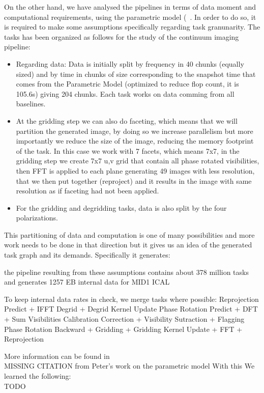 On the other hand, we have analysed the pipelines in terms of data moment and computational requirements, using 
the parametric model (~\cite{ParametricModel}. In order to do so, it is required to make some assumptions specifically regarding
task granunarity. The tasks has been organized as follows for the study of the continuum imaging pipeline:
\begin{itemize}
\item Regarding data: Data is initially split by frequency in 40 chunks (equally sized) and by time in chunks of size corresponding to the snapshot time
that comes from the Parametric Model (optimized to reduce flop count, it is 105.6s) giving 204 chunks. Each task works on data comming from all baselines.
\item At the gridding step we can also do faceting, which means that we will partition the generated image, by doing so we increase parallelism but more
importantly we reduce the size of the image, reducing the memory footprint of the task. 
In this case we work with 7 facets, which means 7x7, in the gridding step we create 7x7 u,v grid that contain
all phase rotated visibilities, then FFT is applied to each plane generating 49 images with less resolution, that we then put together (reproject) and it
results in the image with same resolution as if faceting had not been applied. 
\item For the gridding and degridding tasks, data is also split by the four polarizations.
\end{itemize}
This partitioning of data and computation is one of many possibilities and more work needs to be done in that direction but it gives us an idea
of the generated task graph and its demands. Specifically it generates:

the pipeline resulting from these assumptions contains about 378 million tasks and generates 1257 EB internal data for MID1 ICAL 


To keep internal data rates in check, we merge tasks where possible:
Reprojection Predict + IFFT
Degrid + Degrid Kernel Update
Phase Rotation Predict + DFT + Sum Visibilities
Calibration Correction + Visibility Sutraction + Flagging
Phase Rotation Backward + Gridding + Gridding Kernel Update + FFT + Reprojection

More information can be found in \\ MISSING CITATION from Peter's work on the parametric model
With this We learned the following:  \\ TODO





